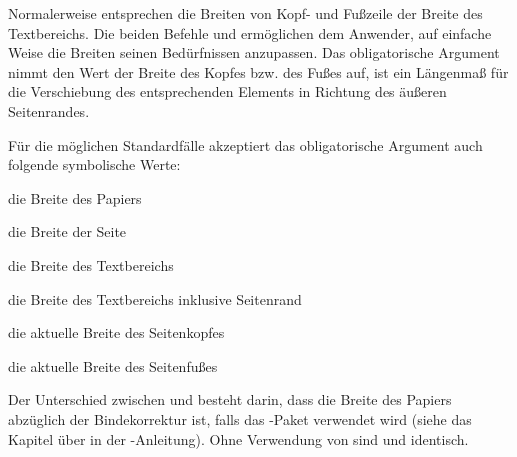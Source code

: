 \begin{Declaration}
%
\end{Declaration}%
Normalerweise entsprechen die Breiten von Kopf- und Fußzeile der Breite des
Textbereichs. Die beiden Befehle
 und  ermöglichen dem Anwender, auf
einfache Weise die Breiten seinen Bedürfnissen anzupassen.  Das obligatorische
Argument  nimmt den Wert der Breite des Kopfes bzw. des Fußes
auf,  ist ein Längenmaß für die Verschiebung des
entsprechenden Elements in Richtung des äußeren Seitenrandes.

Für die möglichen Standardfälle akzeptiert das obligatorische Argument
 auch folgende symbolische Werte:
\begin{labeling}[\ --]{}
\item[\PValue{paper}] die Breite des Papiers
\item[\PValue{page}] die Breite der Seite
\item[\PValue{text}] die Breite des Textbereichs
\item[\PValue{textwithmarginpar}] die Breite des Textbereichs inklusive
Seitenrand
\item[\PValue{head}] die aktuelle Breite des Seitenkopfes
\item[\PValue{foot}] die aktuelle Breite des Seitenfußes
\end{labeling}
Der Unterschied zwischen  und  besteht darin, dass
 die Breite des Papiers abzüglich der Bindekorrektur ist, falls
das -Paket verwendet wird (siehe das
Kapitel über  in der \KOMAScript-Anleitung). Ohne Verwendung
von  sind  und 
identisch.%

